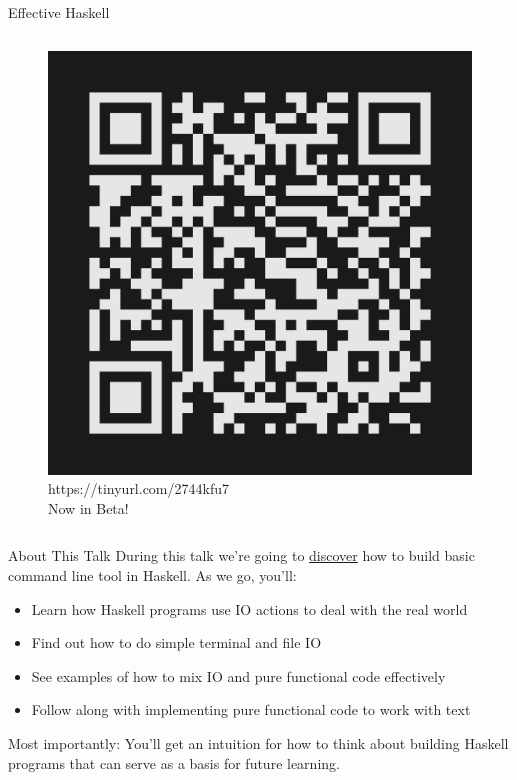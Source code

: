 \documentclass[10pt, presentation, colorlinks]{beamer}
\begin{document}
\begin{frame}[label={sec:org9d7a81c}]{Effective Haskell}
\begin{columns}
\begin{column}[t]{0.45\columnwidth}
\begin{figure}[htbp]
\centering
\includegraphics[height=0.3\textheight]{img/effective-haskell-url.png}
{\tiny{https://tinyurl.com/2744kfu7\\ Now in Beta!}}
\end{figure}
\end{column}
\end{columns}
\end{frame}

\begin{frame}[label={sec:orge40b3e6}]{About This Talk}
During this talk we're going to \uline{discover} how to build basic command
line tool in Haskell. As we go, you'll:

\bigskip

\begin{itemize}
\item Learn how Haskell programs use IO actions to deal with the real world
\item Find out how to do simple terminal and file IO
\item See examples of how to mix IO and pure functional code effectively
\item Follow along with implementing pure functional code to work with text
\end{itemize}

\bigskip

\alert{Most importantly}: You'll get an intuition for how to think about
building Haskell programs that can serve as a basis for future
learning.
\end{frame}
\end{document}
